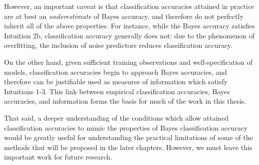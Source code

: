 However, an important caveat is that classification accuracies
attained in practice are at best an \emph{underestimate} of Bayes
accuracy, and therefore do not perfectly inherit all of the above
properties.  For instance, while the Bayes accuracy satisfies
Intuition 2b, classification accuracy generally does not: due to the
phenomenon of overfitting, the inclusion of noise predictors reduces
classification accuracy.

On the other hand, given sufficient training observations and
well-specification of models, classification accuracies begin to
approach Bayes accuracies, and therefore can be justifiable used as
measures of information which satisfy Intuitions 1-3.  This link
between empirical classification accuracies, Bayes accuracies, and
information forms the basis for much of the work in this thesis.

That said, a deeper understanding of the conditions which allow
attained classification accuracies to mimic the properties of Bayes
classification accuracy would be greatly useful for understanding the
practical limitations of some of the methods that will be proposed in
the later chapters.  However, we must leave this important work for
future research.

\fi

